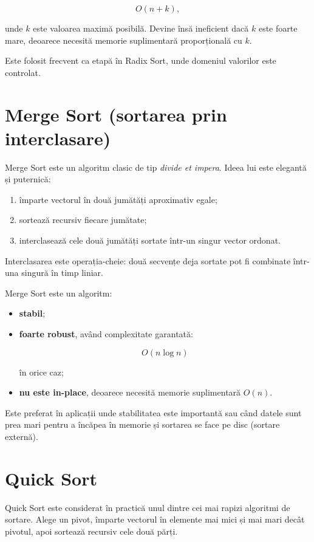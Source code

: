 \documentclass[12pt]{article}
\begin{document}
\[
O(n + k),
\]


unde $k$ este valoarea maximă posibilă. Devine însă ineficient dacă $k$ este foarte mare, deoarece necesită memorie suplimentară proporțională cu $k$.

Este folosit frecvent ca etapă în Radix Sort, unde domeniul valorilor este controlat.

\section{Merge Sort (sortarea prin interclasare)}

Merge Sort este un algoritm clasic de tip \textit{divide et impera}. Ideea lui este elegantă și puternică:

\begin{enumerate}
    \item împarte vectorul în două jumătăți aproximativ egale;
    \item sortează recursiv fiecare jumătate;
    \item interclasează cele două jumătăți sortate într-un singur vector ordonat.
\end{enumerate}

Interclasarea este operația-cheie: două secvențe deja sortate pot fi combinate într-una singură în timp liniar.

Merge Sort este un algoritm:
\begin{itemize}
    \item \textbf{stabil};
    \item \textbf{foarte robust}, având complexitate garantată:
    

\[
    O(n \log n)
    \]


    în orice caz;
    \item \textbf{nu este in-place}, deoarece necesită memorie suplimentară $O(n)$.
\end{itemize}

Este preferat în aplicații unde stabilitatea este importantă sau când datele sunt prea mari pentru a încăpea în memorie și sortarea se face pe disc (sortare externă).

\section{Quick Sort}

Quick Sort este considerat în practică unul dintre cei mai rapizi algoritmi de
sortare. Alege un pivot, împarte vectorul în elemente mai mici și mai mari decât
pivotul, apoi sortează recursiv cele două părți.
\end{document}
